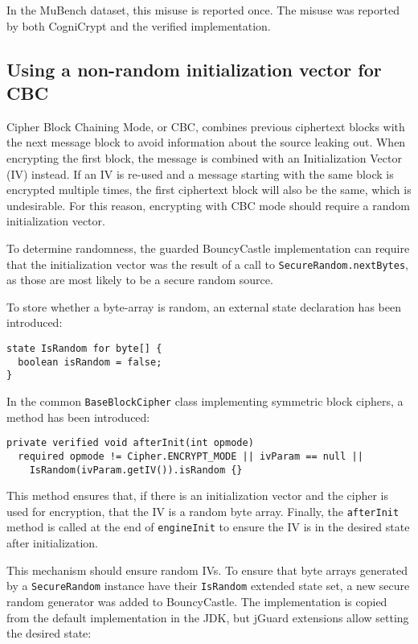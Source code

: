 \documentclass{article}
\begin{document}
In the MuBench dataset, this misuse is reported once.
The misuse was reported by both CogniCrypt and the verified implementation.

\subsection{Using a non-random initialization vector for CBC}\label{sec:NonRandomIV}

Cipher Block Chaining Mode, or CBC, combines previous ciphertext blocks with the next message block to avoid
information about the source leaking out.
When encrypting the first block, the message is combined with an Initialization Vector (IV) instead.
If an IV is re-used and a message starting with the same block is encrypted multiple times, the first
ciphertext block will also be the same, which is undesirable.
For this reason, encrypting with CBC mode should require a random initialization vector.

To determine randomness, the guarded BouncyCastle implementation can require that the initialization vector
was the result of a call to \texttt{SecureRandom.nextBytes}, as those are most likely to be a secure random source.

To store whether a byte-array is random, an external state declaration has been introduced:

\begin{lstlisting}[style=jGuard]
state IsRandom for byte[] {
  boolean isRandom = false;
}
\end{lstlisting}

In the common \texttt{BaseBlockCipher} class implementing symmetric block ciphers, a method
has been introduced:

\begin{lstlisting}[style=jGuard]
private verified void afterInit(int opmode)
  required opmode != Cipher.ENCRYPT_MODE || ivParam == null ||
    IsRandom(ivParam.getIV()).isRandom {}
\end{lstlisting}

This method ensures that, if there is an initialization vector and the cipher is used
for encryption, that the IV is a random byte array.
Finally, the \texttt{afterInit} method is called at the end of \texttt{engineInit} to
ensure the IV is in the desired state after initialization.

This mechanism should ensure random IVs.
To ensure that byte arrays generated by a \texttt{SecureRandom} instance have their
\texttt{IsRandom} extended state set, a new secure random generator was added to
BouncyCastle. The implementation is copied from the default implementation in the JDK,
but jGuard extensions allow setting the desired state:
\end{document}
